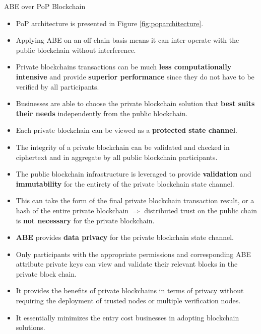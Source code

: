 \documentclass[11pt]{beamer}
\begin{document}
\begin{frame}[allowframebreaks]{ABE over PoP Blockchain}
\begin{itemize}
	\item PoP architecture is presented in Figure \ref{fig:poparchitecture}.
	\item Applying ABE on an off-chain basis means it can inter-operate with the public blockchain without interference.
	\item  Private blockchains transactions can be much
\textbf{less computationally intensive} and provide \textbf{superior performance} since they do not have to be verified by all participants.
	\item Businesses are able to choose the private blockchain solution that \textbf{best suits their needs} independently from the public blockchain.
	\item Each private blockchain can be viewed as a \textbf{protected state channel}.
	\item The integrity of a private blockchain can be validated and checked in ciphertext and in aggregate by all public blockchain participants.
	\item The public blockchain infrastructure is leveraged to provide \textbf{validation} and \textbf{immutability} for the entirety of the private blockchain state channel.
	\item This can take
the form of the final private blockchain transaction result, or a hash of the entire private blockchain $\Rightarrow$ distributed trust on the public chain is \textbf{not necessary} for the private blockchain.
	\item \textbf{ABE} provides \textbf{data privacy} for the private blockchain state channel.
	\item Only participants with the appropriate permissions and corresponding ABE attribute private keys can view and validate their relevant blocks in the private block chain.
	\item It provides the benefits of private blockchains in terms of privacy without requiring the deployment of trusted nodes or multiple verification nodes.
	\item It essentially minimizes the entry cost businesses in adopting blockchain solutions.
\end{itemize}
\end{frame}
\end{document}
